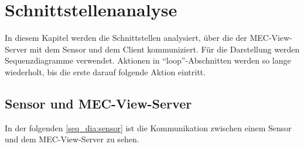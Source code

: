 \section{Schnittstellenanalyse}

In diesem Kapitel werden die Schnittstellen analysiert, über die der MEC-View-Server mit dem Sensor und dem Client kommuniziert.
Für die Darstellung werden Sequenzdiagramme verwendet.
Aktionen in \enquote{loop}-Abschnitten werden so lange wiederholt, bis die erste darauf folgende Aktion eintritt.

\subsection{Sensor und MEC-View-Server}

In der folgenden \autoref{seq_dia:sensor} ist die Kommunikation zwischen einem Sensor und dem MEC-View-Server zu sehen.

